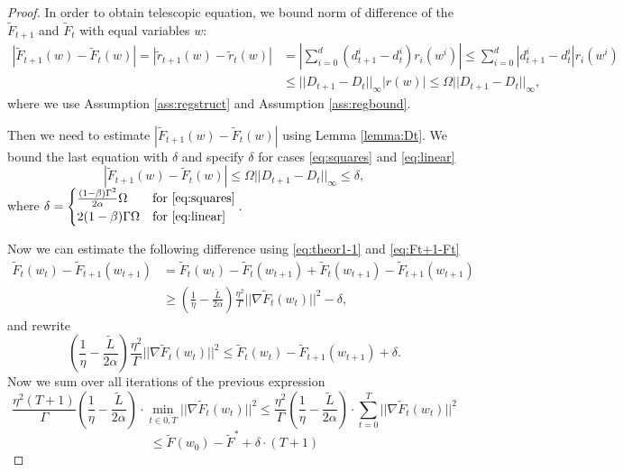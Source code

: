 \begin{proof}
In order to obtain telescopic equation, we bound norm of difference of the $\tilde{F}_{t+1}$ and $\tilde{F}_t$ with equal variables $w$:
\begin{equation*}
\begin{aligned}
    | \widetilde{F}_{t+1}(w) - \widetilde{F}_{t}(w)| = |\widetilde{r}_{t+1}(w) - \widetilde{r}_t(w) | &= \left|\sum\limits_{i=0}^d (d_{t+1}^i - d^i_t)r_i(w^i) \right|
    \le \sum\limits_{i=0}^d |d_{t+1}^i - d^i_t| r_i(w^i) \\
    &\leq ||D_{t+1} - D_t||_\infty |r(w)| \leq \Omega ||D_{t+1} - D_t||_\infty,
\end{aligned}
\end{equation*}
where we use Assumption \ref{ass:regstruct} and Assumption \ref{ass:regbound}.

Then we need to estimate $| \widetilde{F}_{t+1}(w) - \widetilde{F}_{t}(w)|$ using Lemma \ref{lemma:Dt}.
We bound the last equation with $\delta$ and specify $\delta$ for cases \eqref{eq:squares} and \eqref{eq:linear}
\begin{equation}
\label{eq:Ft+1-Ft}
| \widetilde{F}_{t+1}(w) - \widetilde{F}_{t}(w)| \le \Omega ||D_{t+1} - D_t||_\infty \le \delta,
\end{equation}
where $\delta = \begin{cases}
    \frac{(1 - \beta)\Gamma^2}{2\alpha}\Omega & \text{for } \eqref{eq:squares} \\
    2(1 - \beta)\Gamma\Omega  &  \text{for } \eqref{eq:linear}
\end{cases}.$

Now we can estimate the following difference using \eqref{eq:theor1-1} and \eqref{eq:Ft+1-Ft}
\begin{equation*}
\begin{aligned}
\widetilde{F}_t(w_t) - \widetilde{F}_{t+1}(w_{t+1}) &= \widetilde{F}_t(w_t) - \widetilde{F}_{t}(w_{t+1}) + \widetilde{F}_{t}(w_{t+1}) - \widetilde{F}_{t+1}(w_{t+1}) \\ 
&\ge \left(\frac{1}{\eta} - \frac{\tilde{L}}{2\alpha}   \right) \frac{\eta^2}{\Gamma} || \nabla\widetilde{F}_t(w_t) ||^2 - \delta,
\end{aligned}
\end{equation*}
and rewrite
\begin{equation*}
 \left(\frac{1}{\eta} - \frac{\tilde{L}}{2\alpha}   \right) \frac{\eta^2}{\Gamma} || \nabla\widetilde{F}_t(w_t) ||^2 \le \widetilde{F}_t(w_t) - \widetilde{F}_{t+1}(w_{t+1}) + \delta.
\end{equation*}
Now we sum over all iterations of the previous expression
\begin{equation*}
    \frac{\eta^2  (T+1)}{\Gamma}\left(\frac{1}{\eta} - \frac{\tilde{L}}{2\alpha}   \right)\cdot\min_{t \in \overline{0, T}} ||\nabla\widetilde{F}_t(w_t)||^2 \leq \frac{\eta^2}{\Gamma}\left(\frac{1}{\eta} - \frac{\tilde{L}}{2\alpha}   \right)\cdot\sum\limits_{t = 0}^T ||\nabla\widetilde{F}_t(w_t)||^2
\end{equation*}
\begin{equation*}
    \leq \tilde{F}(w_0) - \tilde{F}^* + \delta \cdot (T+1)
\end{equation*}


\end{proof}
